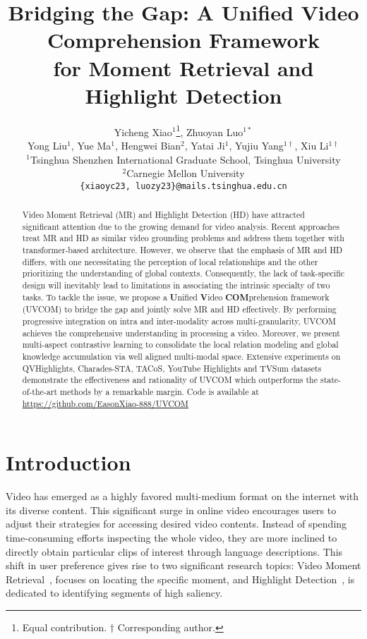 \documentclass[10pt,twocolumn,letterpaper]{article}
\title{Bridging the Gap: A Unified Video Comprehension Framework \\for Moment Retrieval and Highlight Detection}
\author{Yicheng Xiao$^{1}$\thanks{Equal contribution.
  $\dagger$ Corresponding author.}, \quad Zhuoyan Luo$^{1\ast}$\\
  Yong Liu$^{1}$, Yue Ma$^{1}$, Hengwei Bian$^{2}$, Yatai Ji$^{1}$, Yujiu Yang$^{1\dagger}$, Xiu Li$^{1\dagger}$ \\
  $^{1}$Tsinghua Shenzhen International Graduate School, Tsinghua University\\
  $^{2}$Carnegie Mellon University\\
{\tt\small \{xiaoyc23, luozy23\}@mails.tsinghua.edu.cn}
}
\begin{document}
\maketitle
\begin{abstract}
Video Moment Retrieval (MR) and Highlight Detection (HD) have attracted significant attention due to the growing demand for video analysis.
Recent approaches treat MR and HD as similar video grounding problems and address them together with transformer-based architecture.
However, we observe that the emphasis of MR and HD differs, with one necessitating the perception of local relationships and the other prioritizing the understanding of global contexts.
Consequently, the lack of task-specific design will inevitably lead to limitations in associating the intrinsic specialty of two tasks.
To tackle the issue, we propose a \textbf{U}nified \textbf{V}ideo \textbf{COM}prehension framework (UVCOM) to bridge the gap and jointly solve MR and HD effectively.
By performing progressive integration on intra and inter-modality across multi-granularity, UVCOM achieves the comprehensive understanding in processing a video.
Moreover, we present multi-aspect contrastive learning to consolidate the local relation modeling and global knowledge accumulation via well aligned multi-modal space.
Extensive experiments on QVHighlights, Charades-STA, TACoS, YouTube Highlights and TVSum datasets demonstrate the effectiveness and rationality of UVCOM which outperforms the state-of-the-art methods by a remarkable margin.
Code is available at \href{https://github.com/EasonXiao-888/UVCOM}{https://github.com/EasonXiao-888/UVCOM}



\end{abstract} \section{Introduction}
\label{sec:intro}
Video has emerged as a highly favored multi-medium format on the internet with its diverse content.
This significant surge in online video encourages users to adjust their strategies for accessing desired video contents.
Instead of spending time-consuming efforts inspecting the whole video, they are more inclined to directly obtain particular clips of interest through language descriptions.
This shift in user preference gives rise to two significant research topics: Video Moment Retrieval~\cite{ctrl,early_mr_1,man,recent_mr_1,recent_mr_2}, focuses on locating the specific moment, and Highlight Detection~\cite{video2gif,Yao_2016,cvs,LIM-s,joint_va}, is dedicated to identifying segments of high saliency.
\end{document}
